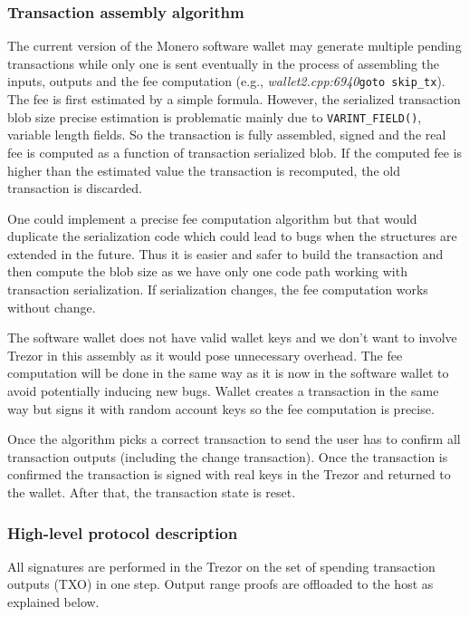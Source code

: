 \documentclass[]{article}
\begin{document}
\subsubsection{Transaction assembly algorithm}

The current version of the Monero software wallet may generate multiple pending transactions while only one is sent eventually in the process of assembling the inputs, outputs and the fee computation (e.g., \emph{wallet2.cpp:6940}\;\verb|goto skip_tx|). The fee is first estimated by a simple formula. However, the serialized transaction blob size precise estimation is problematic mainly due to \verb|VARINT_FIELD()|, variable length fields. So the transaction is fully assembled, signed and the real fee is computed as a function of transaction serialized blob. If the computed fee is higher than the  estimated value the transaction is recomputed, the old transaction is discarded. 

One could implement a precise fee computation algorithm but that would duplicate the serialization code which could lead to bugs when the structures are extended in the future. Thus it is easier and safer to build the transaction and then compute the blob size as we have only one code path working with transaction serialization. If serialization changes, the fee computation works without change. 

The software wallet does not have valid wallet keys and we don't want to involve Trezor in this assembly as it would pose unnecessary overhead. The fee computation will be done in the same way as it is now in the software wallet to avoid potentially inducing new bugs. Wallet creates a transaction in the same way but signs it with random account keys so the fee computation is precise.

Once the algorithm picks a correct transaction to send the user has to confirm all transaction outputs (including the change transaction). Once the transaction is confirmed the transaction is signed with real keys in the Trezor and returned to the wallet. After that, the transaction state is reset.


\subsubsection{High-level protocol description} 
All signatures are performed in the Trezor on the set of spending transaction outputs (TXO) in one step. Output range proofs are offloaded to the host as explained below.
\end{document}
